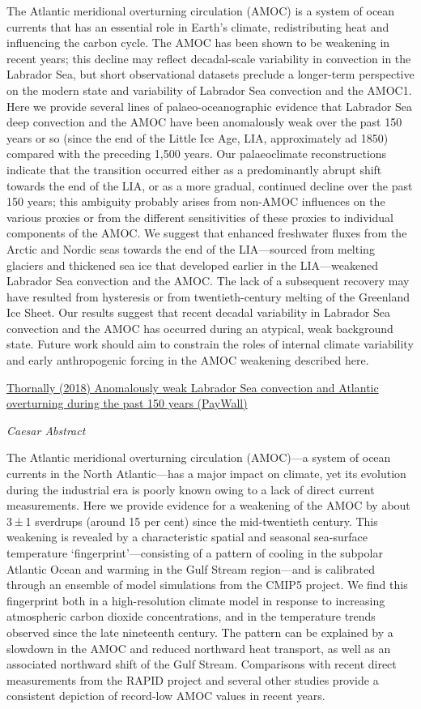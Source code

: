 \documentclass[
]{book}
\begin{document}
The Atlantic meridional overturning circulation (AMOC) is a system of ocean currents that has an essential role in Earth's climate, redistributing heat and influencing the carbon cycle. The AMOC has been shown to be weakening in recent years; this decline may reflect decadal-scale variability in convection in the Labrador Sea, but short observational datasets preclude a longer-term perspective on the modern state and variability of Labrador Sea convection and the AMOC1. Here we provide several lines of palaeo-oceanographic evidence that Labrador Sea deep convection and the AMOC have been anomalously weak over the past 150 years or so (since the end of the Little Ice Age, LIA, approximately ad 1850) compared with the preceding 1,500 years. Our palaeoclimate reconstructions indicate that the transition occurred either as a predominantly abrupt shift towards the end of the LIA, or as a more gradual, continued decline over the past 150 years; this ambiguity probably arises from non-AMOC influences on the various proxies or from the different sensitivities of these proxies to individual components of the AMOC. We suggest that enhanced freshwater fluxes from the Arctic and Nordic seas towards the end of the LIA---sourced from melting glaciers and thickened sea ice that developed earlier in the LIA---weakened Labrador Sea convection and the AMOC. The lack of a subsequent recovery may have resulted from hysteresis or from twentieth-century melting of the Greenland Ice Sheet. Our results suggest that recent decadal variability in Labrador Sea convection and the AMOC has occurred during an atypical, weak background state. Future work should aim to constrain the roles of internal climate variability and early anthropogenic forcing in the AMOC weakening described here.

\href{https://www.nature.com/articles/s41586-018-0007-4}{Thornally (2018) Anomalously weak Labrador Sea convection and Atlantic overturning during the past 150 years (PayWall)}

\emph{Caesar Abstract}

The Atlantic meridional overturning circulation (AMOC)---a system of ocean currents in the North Atlantic---has a major impact on climate, yet its evolution during the industrial era is poorly known owing to a lack of direct current measurements. Here we provide evidence for a weakening of the AMOC by about 3 ± 1 sverdrups (around 15 per cent) since the mid-twentieth century. This weakening is revealed by a characteristic spatial and seasonal sea-surface temperature `fingerprint'---consisting of a pattern of cooling in the subpolar Atlantic Ocean and warming in the Gulf Stream region---and is calibrated through an ensemble of model simulations from the CMIP5 project. We find this fingerprint both in a high-resolution climate model in response to increasing atmospheric carbon dioxide concentrations, and in the temperature trends observed since the late nineteenth century. The pattern can be explained by a slowdown in the AMOC and reduced northward heat transport, as well as an associated northward shift of the Gulf Stream. Comparisons with recent direct measurements from the RAPID project and several other studies provide a consistent depiction of record-low AMOC values in recent years.
\end{document}
